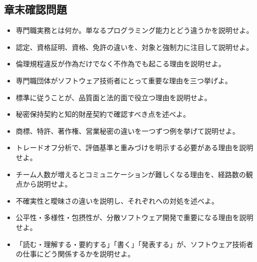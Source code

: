 \documentclass[a4paper,11pt]{ltjsarticle}
\numberwithin{figure}{section}
\numberwithin{table}{section}
\begin{document}
\subsection*{章末確認問題}


\begin{itemize}[leftmargin=2em]

\item 専門職実務とは何か。単なるプログラミング能力とどう違うかを説明せよ。

\item 認定、資格証明、資格、免許の違いを、対象と強制力に注目して説明せよ。

\item 倫理規程違反が作為だけでなく不作為でも起こる理由を説明せよ。

\item 専門職団体がソフトウェア技術者にとって重要な理由を三つ挙げよ。

\item 標準に従うことが、品質面と法的面で役立つ理由を説明せよ。

\item 秘密保持契約と知的財産契約で確認すべき点を述べよ。

\item 商標、特許、著作権、営業秘密の違いを一つずつ例を挙げて説明せよ。

\item トレードオフ分析で、評価基準と重みづけを明示する必要がある理由を説明せよ。

\item チーム人数が増えるとコミュニケーションが難しくなる理由を、経路数の観点から説明せよ。

\item 不確実性と曖昧さの違いを説明し、それぞれへの対処を述べよ。

\item 公平性・多様性・包摂性が、分散ソフトウェア開発で重要になる理由を説明せよ。

\item 「読む・理解する・要約する」「書く」「発表する」が、ソフトウェア技術者の仕事にどう関係するかを説明せよ。

\end{itemize}

\begin{center}
\end{center}
\end{document}
